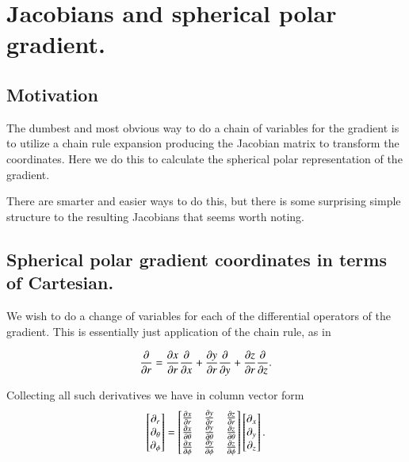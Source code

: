 %

\chapter{Jacobians and spherical polar gradient.}
\label{chap:jacobianSphericalPolar}
{}
\date{Dec 6, 2009}

\beginArtWithToc

\section{Motivation}

The dumbest and most obvious way to do a chain of variables for the gradient is to utilize a chain rule expansion producing the Jacobian matrix to transform the coordinates.  Here we do this to calculate the spherical polar representation of the gradient.

There are smarter and easier ways to do this, but there is some surprising simple structure to the resulting Jacobians that seems worth noting.

\section{Spherical polar gradient coordinates in terms of Cartesian.}

We wish to do a change of variables for each of the differential operators of the gradient.  This is essentially just application of the chain rule, as in

\begin{align}\label{eqn:jacobianSphericalPolar:1}
\PD{r}{} 
= 
\PD{r}{x} \PD{x}{}
+\PD{r}{y} \PD{y}{}
+\PD{r}{z} \PD{z}{}.
\end{align}

Collecting all such derivatives we have in column vector form 
\begin{align}\label{eqn:jacobianSphericalPolar:2}
\begin{bmatrix}
\partial_r \\
\partial_\theta \\
\partial_\phi
\end{bmatrix}
= 
\begin{bmatrix}
\PD{r}{x} &\PD{r}{y} &\PD{r}{z}  \\
\PD{\theta}{x} &\PD{\theta}{y} &\PD{\theta}{z}  \\
\PD{\phi}{x} &\PD{\phi}{y} &\PD{\phi}{z} 
\end{bmatrix}
\begin{bmatrix}
\partial_x \\
\partial_y \\
\partial_z
\end{bmatrix}.
\end{align}

